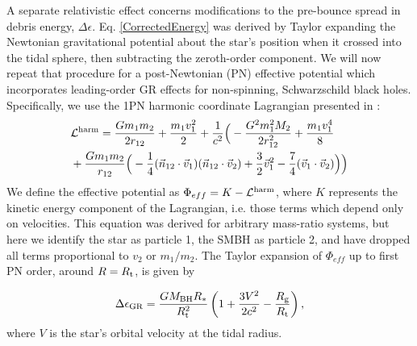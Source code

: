 \documentclass[useAMS, twocolumn, usenatbib]{mn2e}
\begin{document}
A separate relativistic effect concerns modifications to the pre-bounce spread in debris energy, $\Delta \epsilon$.  Eq. \ref{CorrectedEnergy} was derived by Taylor expanding the Newtonian gravitational potential about the star's position when it crossed into the tidal sphere, then subtracting the zeroth-order component.  We will now repeat that procedure for a post-Newtonian (PN) effective potential which incorporates leading-order GR effects for non-spinning, Schwarzschild black holes.  Specifically, we use the 1PN harmonic coordinate Lagrangian presented in \citet[Eq. 174]{Blanchet06}:
\begin{align}
&\mathcal L^{\rm harm}=\frac{Gm_1m_2}{2r_{12}}+\frac{m_1v_1^2}{2}+\frac{1}{c^2} \Big( -\frac{G^2m_1^2M_2}{2r_{12}^2} + \frac{m_1v_1^4}{8} \\
&+ \frac{Gm_1m_2}{r_{12}} \Big( -\frac{1}{4}(\vec{n}_{12}\cdot \vec{v}_1)(\vec{n}_{12}\cdot \vec{v}_2) + \frac{3}{2}\vec{v}_1^2-\frac{7}{4}(\vec{v}_1 \cdot \vec{v}_2)\Big) \Big) \notag
\end{align}
We define the effective potential as $\Phi_{eff}=K-\mathcal L^{\rm harm}$, where $K$ represents the kinetic energy component of the Lagrangian, i.e. those terms which depend only on velocities.  This equation was derived for arbitrary mass-ratio systems, but here we identify the star as particle 1, the SMBH as particle 2, and have dropped all terms proportional to $v_2$ or $m_1/m_2$.  The Taylor expansion of $\Phi_{eff}$ up to first PN order, around $R=R_{\rm t}$, is given by

\begin{equation}
\Delta \epsilon_{\rm GR} = \frac{GM_{\rm BH}R_*}{R_{\rm t}^2}\left(1+\frac{3V^2}{2c^2}-\frac{R_{\rm g}}{R_{\rm t}} \right),
\end{equation}
where $V$ is the star's orbital velocity at the tidal radius.  
\end{document}
